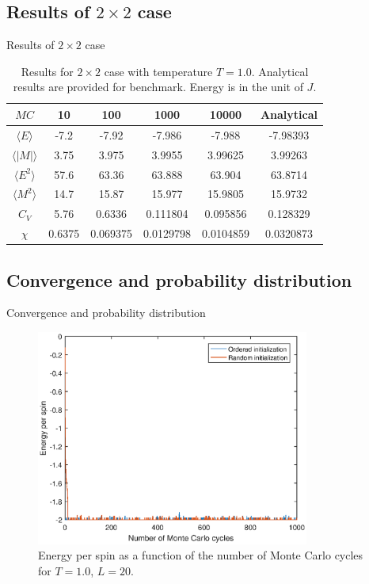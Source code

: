 \documentclass{beamer}
\begin{document}
\subsection{Results of $2 \times 2$ case}
\begin{frame}{Results of $2 \times 2$ case}
\begin{table}
	\centering
	\caption{Results for $2\times2$ case with temperature $T=1.0$. Analytical results are provided for benchmark. 
		Energy is in the unit of $J$. }
	\begin{tabular}{cccccc}
		\hline
		\hline
		$MC$ & 10 & 100 & 1000 & 10000 & Analytical \\ 
		\hline
		$\langle E \rangle$ & -7.2 & -7.92 & -7.986 & -7.988 & -7.98393\\ 
		$\langle |M| \rangle$ & 3.75 & 3.975 & 3.9955 & 3.99625 & 3.99263\\ 
		$\langle E^2 \rangle$ & 57.6  & 63.36 & 63.888 & 63.904 & 63.8714\\ 
		$\langle M^2 \rangle$ & 14.7 & 15.87 & 15.977 & 15.9805 & 15.9732\\ 
		$C_V$ & 5.76 & 0.6336 & 0.111804 & 0.095856 & 0.128329\\ 
		$\chi$ & 0.6375 & 0.069375 & 0.0129798 & 0.0104859 & 0.0320873\\ 
		\hline
		\hline 
	\end{tabular} 
	\label{tab:2times2result}
\end{table}
\end{frame}

\subsection{Convergence and probability distribution}
\begin{frame}{Convergence and probability distribution}
\begin{figure}
	\includegraphics[width=0.8\textwidth]{Process_ene_lowT.eps}
	\caption{Energy per spin as a function of the number of Monte Carlo cycles for $T=1.0$, $L=20$. }
\end{figure}
\end{frame}
\end{document}
